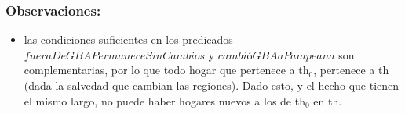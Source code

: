     \subsubsection{Observaciones:}
        \begin{itemize}
            \item las condiciones suficientes en los predicados $fueraDeGBAPermaneceSinCambios$ y $cambi$\'o$GBAaPampeana$
            son complementarias, por lo que todo hogar que pertenece a th$_{0}$, pertenece a th (dada la salvedad que cambian las regiones).
            Dado esto, y el hecho que tienen el mismo largo, no puede haber hogares nuevos a los de th$_{0}$ en th.
        \end{itemize}
